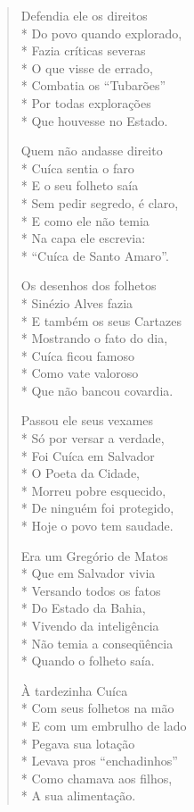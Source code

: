 \begin{verse}
Defendia ele os direitos\\*
Do povo quando explorado,\\*
Fazia críticas severas\\*
O que visse de errado,\\*
Combatia os ``Tubarões''\\*
Por todas explorações\\*
Que houvesse no Estado.

Quem não andasse direito\\*
Cuíca sentia o faro\\*
E o seu folheto saía\\*
Sem pedir segredo, é claro,\\*
E como ele não temia\\*
Na capa ele escrevia:\\*
``Cuíca de Santo Amaro''.

Os desenhos dos folhetos\\*
Sinézio Alves fazia\\*
E também os seus Cartazes\\*
Mostrando o fato do dia,\\*
Cuíca ficou famoso\\*
Como vate valoroso\\*
Que não bancou covardia.

Passou ele seus vexames\\*
Só por versar a verdade,\\*
Foi Cuíca em Salvador\\*
O Poeta da Cidade,\\*
Morreu pobre esquecido,\\*
De ninguém foi protegido,\\*
Hoje o povo tem saudade.

Era um Gregório de Matos\\*
Que em Salvador vivia\\*
Versando todos os fatos\\*
Do Estado da Bahia,\\*
Vivendo da inteligência\\*
Não temia a conseqüência\\*
Quando o folheto saía.

À tardezinha Cuíca\\*
Com seus folhetos na mão\\*
E com um embrulho de lado\\*
Pegava sua lotação\\*
Levava pros ``enchadinhos''\\*
Como chamava aos filhos,\\*
A sua alimentação.


\end{verse}
